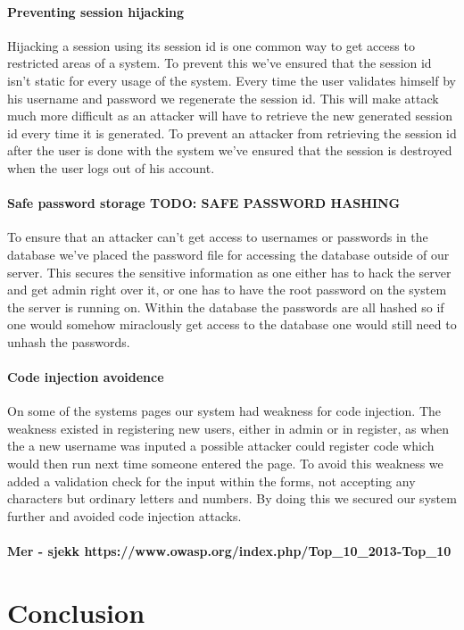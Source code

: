 \documentclass[11pt, a4paper]{article}
\begin{document}
\paragraph{Preventing session hijacking}
Hijacking a session using its session id is one common way to get access to restricted areas of a system. To prevent this we've ensured that the session id isn't static for every usage of the system. Every time the user validates himself by his username and password we regenerate the session id. This will make attack much more difficult as an attacker will have to retrieve the new generated session id every time it is generated. To prevent an attacker from retrieving the session id after the user is done with the system we've ensured that the session is destroyed when the user logs out of his account. 
\paragraph{Safe password storage TODO: SAFE PASSWORD HASHING}
To ensure that an attacker can't get access to usernames or passwords in the database we've placed the password file for accessing the database outside of our server. This secures the sensitive information as one either has to hack the server and get admin right over it, or one has to have the root password on the system the server is running on. Within the database the passwords are all hashed so if one would somehow miraclously get access to the database one would still need to unhash the passwords. 
\paragraph{Code injection avoidence}
On some of the systems pages our system had weakness for code injection. The weakness existed in registering new users, either in admin or in register, as when the a new username was inputed a possible attacker could register code which would then run next time someone entered the page. To avoid this weakness we added a validation check for the input within the forms, not accepting any characters but ordinary letters and numbers. By doing this we secured our system further and avoided code injection attacks. 
\paragraph{Mer - sjekk https://www.owasp.org/index.php/Top\_10\_2013-Top\_10}
\section{Conclusion}
\end{document}
